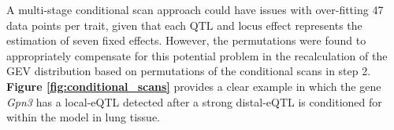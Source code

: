 \documentclass[9pt,twocolumn,twoside]{gsajnl}
\begin{document}
A multi-stage conditional scan approach could have issues with over-fitting 47 data points per trait, given that each $\text{QTL}$ and $\text{locus}$ effect represents the estimation of seven fixed effects. However, the permutations were found to appropriately compensate for this potential problem in the recalculation of the GEV distribution based on permutations of the conditional scans in step 2. \textbf{Figure \ref{fig:conditional_scans}} provides a clear example in which the gene \textit{Gpn3} has a local-eQTL detected after a strong distal-eQTL is conditioned for within the model in lung tissue. 




\end{document}
